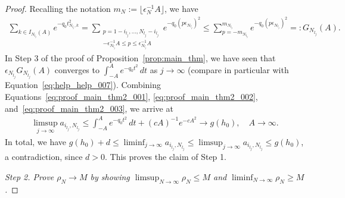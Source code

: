 \begin{proof}
    
    Recalling the notation $m_N:=\lfloor\epsilon_N^{-1}A\rfloor$, we have
    \begin{align}\label{eq:proof_main_thm2_003}
        \sum_{k\in I_{N_{l_j}}(A)}e^{-q_0t_{N_{l_j},k}^2}=\sum_{\substack{p=1-i_{l_j},\dots,N_{l_j}-i_{l_j}\\-\epsilon_{N_{l_j}}^{-1}A\le p\le\epsilon_{N_{l_j}}^{-1}A}}e^{-q_0(p\epsilon_{N_{l_j}})^2}\le\sum_{p=-m_{N_{l_j}}}^{m_{N_{l_j}}}e^{-q_0(p\epsilon_{N_{l_j}})^2}=:G_{N_{l_j}}(A).
    \end{align}
    In Step 3 of the proof of Proposition~\ref{prop:main_thm}, we have seen that $\epsilon_{N_{l_j}}G_{N_{l_j}}(A)$ converges to $\int_{-A}^{A}e^{-q_0t^2}\,dt$ as $j\to\infty$ (compare in particular with Equation~\eqref{eq:help_help_007}). Combining Equations~\eqref{eq:proof_main_thm2_001}, \eqref{eq:proof_main_thm2_002}, and~\eqref{eq:proof_main_thm2_003}, we arrive at
    \begin{align*}
        \limsup_{j\to\infty}a_{i_{l_j},N_{l_j}}\le\int_{-A}^{A}e^{-q_0t^2}\,dt+(cA)^{-1}e^{-cA^2}\to g(h_0),\quad A\to\infty.
    \end{align*}
    In total, we have $g(h_0)+d\le\liminf_{j\to\infty}a_{i_{l_j},N_{l_j}}\le\limsup_{j\to\infty}a_{i_{l_j},N_{l_j}}\le g(h_0)$, a contradiction, since $d>0$. This proves the claim of Step 1.

    \textit{Step 2. Prove $\rho_N\to M$ by showing $\limsup_{N\to\infty}\rho_N\le M$ and $\liminf_{N\to\infty}\rho_N\ge M$.}


\end{proof}

